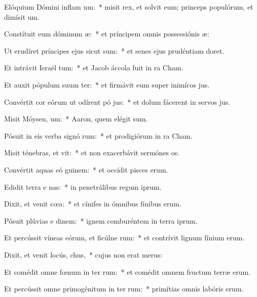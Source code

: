 \item Elóquium Dómini inflam um:~* misit rex, et solvit eum; princeps populórum, et dimísit um.
\item Constítuit eum dóminum  æ:~* et príncipem omnis possessiónis æ:
\item Ut erudíret príncipes ejus sicut sum:~* et senes ejus prudéntiam doret.
\item Et intrávit Israël  tum:~* et Jacob áccola fuit in ra Cham.
\item Et auxit pópulum suum ter:~* et firmávit eum super inimícos jus.
\item Convértit cor eórum ut odírent pó jus:~* et dolum fácerent in servos jus.
\item Misit Móysen,  um:~* Aaron, quem elégit sum.
\item Pósuit in eis verba signó rum:~* et prodigiórum in ra Cham.
\item Misit ténebras, et vit:~* et non exacerbávit sermónes os.
\item Convértit aquas eó  guinem:~* et occídit pisces erum.
\item Edidit terra e nas:~* in penetrálibus regum iprum.
\item Dixit, et venit cœa:~* et cínifes in ómnibus fínibus erum.
\item Pósuit plúvias e dinem:~* ignem comburéntem in terra iprum.
\item Et percússit víneas eórum, et ficúlne rum:~* et contrívit lignum fínium erum.
\item Dixit, et venit locús,  chus,~* cujus non erat merus:
\item Et comédit omne fœnum in ter rum:~* et comédit omnem fructum terræ erum.
\item Et percússit omne primogénitum in ter rum:~* primítias omnis labóris erum.
